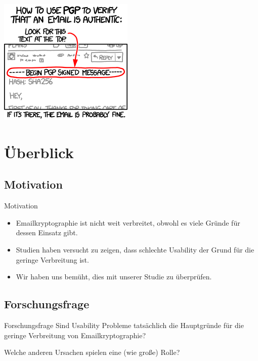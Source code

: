 \documentclass[]{beamer}
\begin{document}
\begin{frame}
	\titlepage
\end{frame}


\begin{frame}
	\begin{center}
		\includegraphics[scale=0.7]{pic/pgp.png}
	\end{center}

\end{frame}

\section{Überblick}

\subsection{Motivation}
\begin{frame}{Motivation}
\begin{itemize}
	\item Emailkryptographie ist nicht weit verbreitet, obwohl es viele Gründe für dessen Einsatz gibt.
	\item Studien haben versucht zu zeigen, dass schlechte Usability der Grund für die geringe Verbreitung ist.
	\item Wir haben uns bemüht, dies mit unserer Studie zu überprüfen.
\end{itemize}
\end{frame}


\subsection{Forschungsfrage}
\begin{frame}{Forschungsfrage}
	Sind Usability Probleme tatsächlich die Hauptgründe für die geringe Verbreitung von Email\-kryp\-to\-gra\-phie?

	Welche anderen Ursachen spielen eine (wie große) Rolle?
\end{frame}
\end{document}

